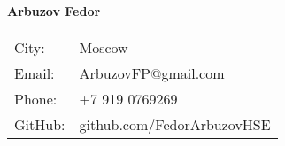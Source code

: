 \documentclass[a4paper,12pt]{article}
\begin{document}

\noindent \LARGE{\textbf{Arbuzov Fedor}} \\
\vspace{-2ex}
\hline
\normalsize


\begin{center}
\begin{tabular}{l l}
 City: & \hspace{0.8in} Moscow \\
 Email: & \hspace{0.8in} ArbuzovFP@gmail.com \\
 Phone: & \hspace{0.8in} +7 919 0769269 \\
 GitHub: & \hspace{0.8in} github.com/FedorArbuzovHSE \\
\end{tabular}
\end{center}

\vspace{1em}

\end{document}

